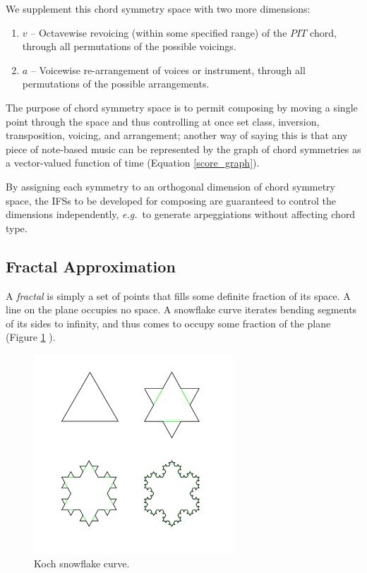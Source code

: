 \documentclass[english,11pt,letterpaper,onecolumn]{scrartcl}
\numberwithin{equation}{section}
\begin{document}
\noindent We supplement this chord symmetry space with two more dimensions:

\begin{enumerate}[resume]
\item $v$ -- Octavewise revoicing (within some specified range) of the $PIT$
chord, through all permutations of the possible voicings.
\item $a$ -- Voicewise re-arrangement of voices or instrument, through all
permutations of the possible arrangements.
\end{enumerate}

\noindent The purpose of chord symmetry space is to permit composing by moving a
single point through the space and thus controlling at once set class,
inversion, transposition, voicing, and arrangement; another way of saying this
is that any piece of note-based music can be represented by the graph of chord
symmetries as a vector-valued function of time (Equation \eqref{score_graph}).

By assigning each symmetry to an orthogonal dimension of chord symmetry space,
the IFSs to be developed for composing are guaranteed to control the dimensions
independently, \textit{e.g.}\ to generate arpeggiations without affecting chord
type.

\subsection{Fractal Approximation}

A \textit{fractal} is simply a set of points that fills some definite fraction
of its space. A line on the plane occupies no space. A snowflake curve
iterates bending segments of its sides to infinity, and thus comes to occupy
some fraction of the plane (Figure \ref{fig:kochflake}
\cite{Mandelbrot:1982:FGN}).

\begin{figure}
\centerline{\includegraphics[width = 0.6667\textwidth]{KochFlake}}
\caption{\label{fig:kochflake} Koch snowflake
curve.\protect\footnotemark}
\end{figure}
\end{document}
